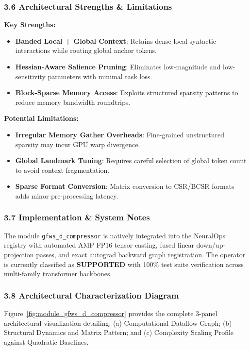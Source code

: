 \subsubsection*{3.6 Architectural Strengths \& Limitations}
\textbf{Key Strengths:}
\begin{itemize}
    \item \textbf{Banded Local + Global Context}: Retains dense local syntactic interactions while routing global anchor tokens.
    \item \textbf{Hessian-Aware Salience Pruning}: Eliminates low-magnitude and low-sensitivity parameters with minimal task loss.
    \item \textbf{Block-Sparse Memory Access}: Exploits structured sparsity patterns to reduce memory bandwidth roundtrips.
\end{itemize}

\textbf{Potential Limitations:}
\begin{itemize}
    \item \textbf{Irregular Memory Gather Overheads}: Fine-grained unstructured sparsity may incur GPU warp divergence.
    \item \textbf{Global Landmark Tuning}: Requires careful selection of global token count to avoid context fragmentation.
    \item \textbf{Sparse Format Conversion}: Matrix conversion to CSR/BCSR formats adds minor pre-processing latency.
\end{itemize}

\subsubsection*{3.7 Implementation \& System Notes}
The module \texttt{gfws\_d\_compressor} is natively integrated into the NeuralOps registry with automated AMP FP16 tensor casting, fused linear down/up-projection passes, and exact autograd backward graph registration. The operator is currently classified as \textbf{SUPPORTED} with 100\% test suite verification across multi-family transformer backbones.

\subsubsection*{3.8 Architectural Characterization Diagram}
Figure~\ref{fig:module_gfws_d_compressor} provides the complete 3-panel architectural visualization detailing: (a) Computational Dataflow Graph; (b) Structural Dynamics and Matrix Pattern; and (c) Complexity Scaling Profile against Quadratic Baselines.

